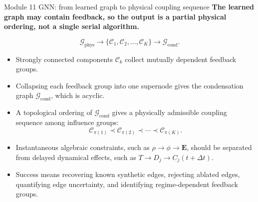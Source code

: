 \documentclass[aspectratio=169,10pt]{beamer}
\begin{document}
\begin{frame}{Module 11 GNN: from learned graph to physical coupling sequence}
\small
\textbf{The learned graph may contain feedback, so the output is a partial physical ordering, not a single serial algorithm.}

\vspace{-0.1em}
\begin{equation*}
\mathcal G_{\mathrm{phys}}
\longrightarrow
\{\mathcal C_1,\mathcal C_2,\ldots,\mathcal C_K\}
\longrightarrow
\mathcal G_{\mathrm{cond}}.
\end{equation*}

\vspace{-0.15em}
\begin{itemize}
    \item Strongly connected components $\mathcal C_k$ collect mutually dependent feedback groups.
    \item Collapsing each feedback group into one supernode gives the condensation graph $\mathcal G_{\mathrm{cond}}$, which is acyclic.
    \item A topological ordering of $\mathcal G_{\mathrm{cond}}$ gives a physically admissible coupling sequence among influence groups:
    \[
        \mathcal C_{\pi(1)}\prec \mathcal C_{\pi(2)}\prec\cdots\prec \mathcal C_{\pi(K)}.
    \]
    \item Instantaneous algebraic constraints, such as $\rho\rightarrow\phi\rightarrow\mathbf E$, should be separated from delayed dynamical effects, such as $T\rightarrow D_j\rightarrow C_j(t+\Delta t)$.
    \item Success means recovering known synthetic edges, rejecting ablated edges, quantifying edge uncertainty, and identifying regime-dependent feedback groups.
\end{itemize}
\end{frame}
\end{document}
